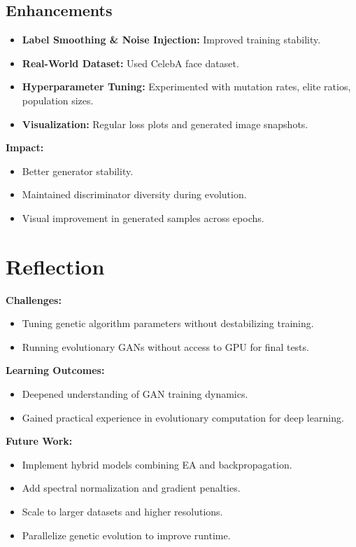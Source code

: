 \documentclass[12pt]{article}
\begin{document}
\subsection{Enhancements}
\begin{itemize}
    \item \textbf{Label Smoothing \& Noise Injection:} Improved training stability.
    \item \textbf{Real-World Dataset:} Used CelebA face dataset.
    \item \textbf{Hyperparameter Tuning:} Experimented with mutation rates, elite ratios, population sizes.
    \item \textbf{Visualization:} Regular loss plots and generated image snapshots.
\end{itemize}

\textbf{Impact:}
\begin{itemize}
    \item Better generator stability.
    \item Maintained discriminator diversity during evolution.
    \item Visual improvement in generated samples across epochs.
\end{itemize}

\section{Reflection}
\textbf{Challenges:}
\begin{itemize}
    \item Tuning genetic algorithm parameters without destabilizing training.
    \item Running evolutionary GANs without access to GPU for final tests.
\end{itemize}

\textbf{Learning Outcomes:}
\begin{itemize}
    \item Deepened understanding of GAN training dynamics.
    \item Gained practical experience in evolutionary computation for deep learning.
\end{itemize}

\textbf{Future Work:}
\begin{itemize}
    \item Implement hybrid models combining EA and backpropagation.
    \item Add spectral normalization and gradient penalties.
    \item Scale to larger datasets and higher resolutions.
    \item Parallelize genetic evolution to improve runtime.
\end{itemize}
\end{document}
